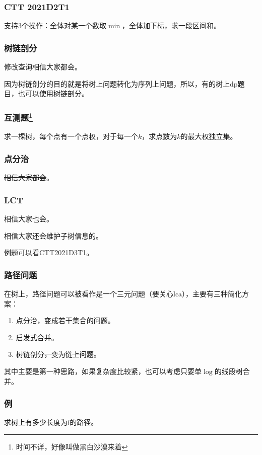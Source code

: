 \documentclass[10pt]{beamer}
\begin{document}
	\clearpage
	\begin{frame}
		\frametitle{CTT 2021D2T1}
		
		支持$3$个操作：全体对某一个数取$\min$，全体加下标，求一段区间和。
	
	\end{frame}
	\clearpage
	\begin{frame}
		\frametitle{树链剖分}
	
		修改查询相信大家都会。

		因为树链剖分的目的就是将树上问题转化为序列上问题，所以，有的树上dp题目，也可以使用树链剖分。
	
	\end{frame}
	\clearpage
	\begin{frame}
		\frametitle{互测题\footnote{时间不详，好像叫做黑白沙漠来着}}
	
		求一棵树，每个点有一个点权，对于每一个$k$，求点数为$k$的最大权独立集。
	
	\end{frame}
	\clearpage
	\begin{frame}
		\frametitle{点分治}
	
		\sout{相信大家都会}。

	\end{frame}
	\clearpage
	\begin{frame}
		\frametitle{LCT}
	
		相信大家也会。

		相信大家还会维护子树信息的。

		例题可以看CTT2021D3T1。

	\end{frame}
	\clearpage
	\begin{frame}
		\frametitle{路径问题}
	
		在树上，路径问题可以被看作是一个三元问题（要关心lca），主要有三种简化方案：

		\begin{enumerate}
			\item 点分治，变成若干集合的问题。
			\item 启发式合并。
			\item \sout{树链剖分，变为链上问题}。
		\end{enumerate}

		其中主要是第一种思路，如果复杂度比较紧，也可以考虑只要单$\log$的线段树合并。
	
	\end{frame}
	\clearpage
	\begin{frame}
		\frametitle{例}
	
		求树上有多少长度为$l$的路径。
	
	\end{frame}
\end{document}
